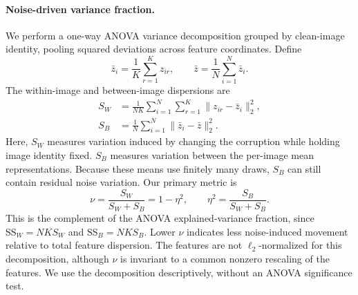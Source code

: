 \paragraph{Noise-driven variance fraction.}
We perform a one-way ANOVA variance decomposition grouped by clean-image
identity, pooling squared deviations across feature coordinates. Define
\begin{equation}
    \bar z_i = \frac{1}{K}\sum_{r=1}^{K}z_{ir},
    \qquad
    \bar z = \frac{1}{N}\sum_{i=1}^{N}\bar z_i.
\end{equation}
The within-image and between-image dispersions are
\begin{equation}
\begin{aligned}
    S_W &= \frac{1}{NK}\sum_{i=1}^{N}\sum_{r=1}^{K}
             \lVert z_{ir}-\bar z_i\rVert_2^2,\\
    S_B &= \frac{1}{N}\sum_{i=1}^{N}
             \lVert\bar z_i-\bar z\rVert_2^2.
\end{aligned}
\end{equation}
Here, $S_W$ measures variation induced by changing the corruption while holding
image identity fixed. $S_B$ measures variation between the per-image mean
representations. Because these means use finitely many draws, $S_B$ can still
contain residual noise variation.
Our primary metric is
\begin{equation}
    \nu = \frac{S_W}{S_W+S_B} = 1-\eta^2,
    \qquad
    \eta^2 = \frac{S_B}{S_W+S_B}.
    \label{eq:noise_variance_fraction}
\end{equation}
This is the complement of the ANOVA explained-variance fraction, since
$\mathrm{SS}_W=NK S_W$ and $\mathrm{SS}_B=NK S_B$.
Lower $\nu$ indicates less noise-induced movement relative to total feature
dispersion. The features are not $\ell_2$-normalized for this decomposition,
although $\nu$ is invariant to a common nonzero rescaling of the features.
We use the decomposition descriptively, without an ANOVA significance test.

